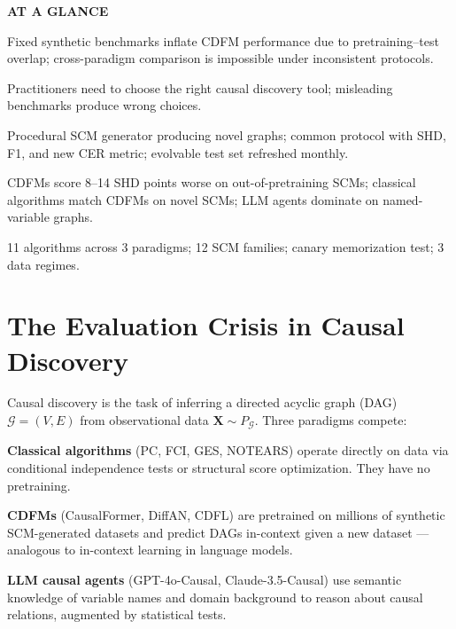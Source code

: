 \documentclass[10pt,twocolumn]{article}
\begin{document}
\begin{mdframed}[backgroundcolor=boxgray,linecolor=rulered,linewidth=1pt,
    innerleftmargin=6pt,innerrightmargin=6pt,
    innertopmargin=6pt,innerbottommargin=6pt]
\textbf{\small AT A GLANCE}\par\vspace{4pt}
\begin{description}[leftmargin=0pt,labelsep=4pt,itemsep=2pt,parsep=0pt,
    font=\small\bfseries]
  \item[Problem:] Fixed synthetic benchmarks inflate CDFM performance
    due to pretraining--test overlap; cross-paradigm comparison is
    impossible under inconsistent protocols.
  \item[Why it matters:] Practitioners need to choose the right
    causal discovery tool; misleading benchmarks produce wrong choices.
  \item[Method:] Procedural SCM generator producing novel graphs;
    common protocol with SHD, F1, and new CER metric; evolvable
    test set refreshed monthly.
  \item[Result:] CDFMs score 8--14 SHD points worse on out-of-pretraining
    SCMs; classical algorithms match CDFMs on novel SCMs; LLM agents
    dominate on named-variable graphs.
  \item[Evidence:] 11 algorithms across 3 paradigms; 12 SCM families;
    canary memorization test; 3 data regimes.
\end{description}
\end{mdframed}

\section{The Evaluation Crisis in Causal Discovery}

Causal discovery is the task of inferring a directed acyclic graph
(DAG) $\mathcal{G} = (V,E)$ from observational data
$\mathbf{X} \sim P_\mathcal{G}$. Three paradigms compete:

\textbf{Classical algorithms} (PC, FCI, GES, NOTEARS) operate
directly on data via conditional independence tests or structural
score optimization. They have no pretraining.

\textbf{CDFMs} (CausalFormer, DiffAN, CDFL) are pretrained on
millions of synthetic SCM-generated datasets and predict DAGs
in-context given a new dataset --- analogous to in-context learning
in language models.

\textbf{LLM causal agents} (GPT-4o-Causal, Claude-3.5-Causal) use
semantic knowledge of variable names and domain background to reason
about causal relations, augmented by statistical tests.
\end{document}
